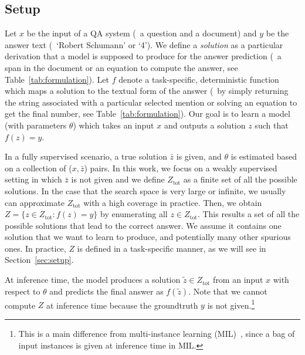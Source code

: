 \documentclass[11pt,a4paper]{article}
\begin{document}
\subsection{Setup}
Let $x$ be the input of a QA system (\eg\ a question and a document) and $y$ be the answer text (\eg\ `Robert Schumann' or `4').
We define a {\em solution} as a particular derivation that a model is supposed to produce for the answer prediction (\eg\ a span in the document or an equation to compute the  answer, see Table~\ref{tab:formulation}).
Let $f$ denote a task-specific, deterministic function which maps a solution to the textual form of the answer (\eg\ by simply returning the string associated with a particular selected mention or solving an equation to get the final number, see Table~\ref{tab:formulation}). Our goal is to learn a model (with parameters $\theta{}$) which takes an input $x$ and outputs a solution $z$ such that $f(z) = y$.

In a fully supervised scenario, a true solution $\bar{z}$ is given, and $\theta$ is estimated based on a collection of ($x, \bar{z}$) pairs. In this work, we focus on a weakly supervised setting in which $\bar{z}$ is not given and we define $Z_\text{tot}$ as a finite set of all the possible solutions. In the case that the search space is very large or infinite, we usually can approximate $Z_\text{tot}$ with a high coverage in practice. Then, we obtain $Z = \{ z \in Z_\text{tot}: f(z) = y \}$ by enumerating all $z \in Z_\text{tot}$.
This results a set of all the possible solutions that lead to the correct answer. We assume it contains one solution that we want to learn to produce, and potentially many other spurious ones. In practice, $Z$ is defined in a task-specific manner, as we will see in Section~\ref{sec:setup}.


At inference time, the model produces a solution $\tilde{z} \in Z_\text{tot}$ from an input $x$ with respect to $\theta$ and predicts the final answer as $f(\tilde{z})$.
Note that we cannot compute $Z$ at inference time because the groundtruth $y$ is not given.\footnote{
    This is a main difference from multi-instance learning (MIL)~\citep{multiinstancelearning}, since a bag of input instances is given at inference time in MIL.
}
\end{document}
